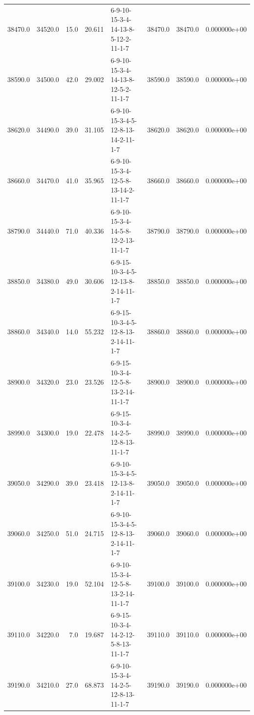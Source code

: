 \begin{tabular}{rrrrlrrr}
 38470.0 &  34520.0 &           15.0 &             20.611 &  6-9-10-15-3-4-14-13-8-5-12-2-11-1-7 &       38470.0 &         38470.0 &  0.000000e+00 \\
 38590.0 &  34500.0 &           42.0 &             29.002 &  6-9-10-15-3-4-14-13-8-12-5-2-11-1-7 &       38590.0 &         38590.0 &  0.000000e+00 \\
 38620.0 &  34490.0 &           39.0 &             31.105 &  6-9-10-15-3-4-5-12-8-13-14-2-11-1-7 &       38620.0 &         38620.0 &  0.000000e+00 \\
 38660.0 &  34470.0 &           41.0 &             35.965 &  6-9-10-15-3-4-12-5-8-13-14-2-11-1-7 &       38660.0 &         38660.0 &  0.000000e+00 \\
 38790.0 &  34440.0 &           71.0 &             40.336 &  6-9-10-15-3-4-14-5-8-12-2-13-11-1-7 &       38790.0 &         38790.0 &  0.000000e+00 \\
 38850.0 &  34380.0 &           49.0 &             30.606 &  6-9-15-10-3-4-5-12-13-8-2-14-11-1-7 &       38850.0 &         38850.0 &  0.000000e+00 \\
 38860.0 &  34340.0 &           14.0 &             55.232 &  6-9-15-10-3-4-5-12-8-13-2-14-11-1-7 &       38860.0 &         38860.0 &  0.000000e+00 \\
 38900.0 &  34320.0 &           23.0 &             23.526 &  6-9-15-10-3-4-12-5-8-13-2-14-11-1-7 &       38900.0 &         38900.0 &  0.000000e+00 \\
 38990.0 &  34300.0 &           19.0 &             22.478 &  6-9-15-10-3-4-14-2-5-12-8-13-11-1-7 &       38990.0 &         38990.0 &  0.000000e+00 \\
 39050.0 &  34290.0 &           39.0 &             23.418 &  6-9-10-15-3-4-5-12-13-8-2-14-11-1-7 &       39050.0 &         39050.0 &  0.000000e+00 \\
 39060.0 &  34250.0 &           51.0 &             24.715 &  6-9-10-15-3-4-5-12-8-13-2-14-11-1-7 &       39060.0 &         39060.0 &  0.000000e+00 \\
 39100.0 &  34230.0 &           19.0 &             52.104 &  6-9-10-15-3-4-12-5-8-13-2-14-11-1-7 &       39100.0 &         39100.0 &  0.000000e+00 \\
 39110.0 &  34220.0 &            7.0 &             19.687 &  6-9-15-10-3-4-14-2-12-5-8-13-11-1-7 &       39110.0 &         39110.0 &  0.000000e+00 \\
 39190.0 &  34210.0 &           27.0 &             68.873 &  6-9-10-15-3-4-14-2-5-12-8-13-11-1-7 &       39190.0 &         39190.0 &  0.000000e+00 \\

\end{tabular}
